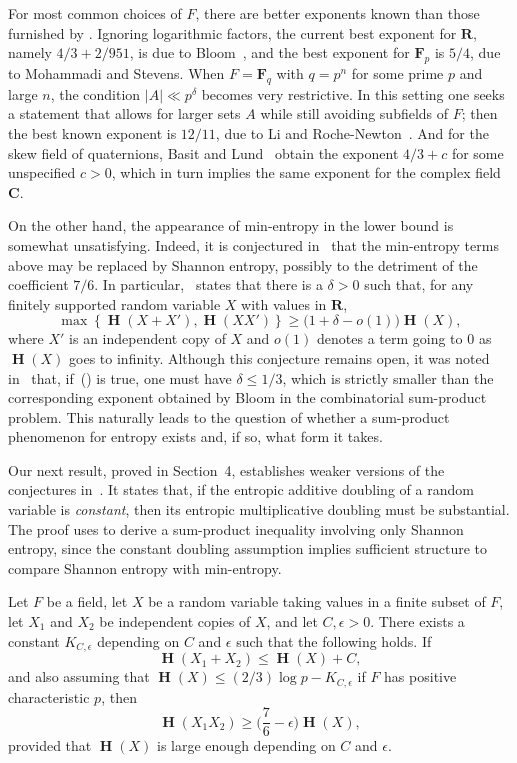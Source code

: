 \documentclass[twoside, 10pt]{article}
\renewcommand{\eqref}[1]{\textup{{\normalfont(\oldstylenums{\ref{#1}}}\normalfont)}}
\newcommand\eps{\epsilon}
\newcommand\FF{{\mathbf{F}}}
\DeclareMathOperator{\Eta}{\mathbf{H}}
\newcommand{\RR}{\mathbf{R}}   %
\newcommand{\CC}{\mathbf{C}}   %
\begin{document}
For most common choices of $F$, there are better exponents known than those furnished by .
Ignoring logarithmic factors, the current best exponent for $\RR$, 
namely $4/3 + 2/951$, is due to Bloom~\cite{bloom2025}, 
and the best exponent for $\FF_p$ is $5/4$, due to Mohammadi and Stevens. 
When $F = \FF_q$ with $q=p^n$ for some prime $p$ and large $n$, 
the condition $|A|\ll p^\delta$ becomes very restrictive. 
In this setting one seeks a statement that allows for larger 
sets $A$ while still avoiding subfields of $F$;
then the best known exponent is $12/11$, due to Li 
and Roche-Newton~\cite{LiRocheNewton}.
And for the skew field of quaternions,
Basit and Lund~\cite{basitlund2019}
obtain the exponent $4/3 + c$ for 
some unspecified $c>0$,
which in turn implies the same exponent for the complex field $\CC$.

On the other hand, the appearance of min-entropy in the 
lower bound is somewhat unsatisfying. Indeed, it is conjectured in~\cite{goh2024} that the min-entropy terms 
above may be replaced by Shannon entropy, possibly to 
the detriment of the coefficient $7/6$. 
In particular,~\cite[Conjecture~18]{goh2024} states that there is a
$\delta>0$ such that, for any finitely supported
random variable $X$ with values in $\RR$,
\begin{equation}
\max\left\{\Eta(X+X'), \Eta(XX') \right\} \ge 
\bigl(1+\delta-o(1)\bigr) \Eta(X),
\label{eq:conjecture}
\end{equation}
where $X'$ is an independent copy of $X$ and
$o(1)$ denotes a term going to $0$ as $\Eta(X)$ goes to infinity.
Although this conjecture remains open, it
was noted in~\cite{lgk2025} that, if~\eqref{eq:conjecture}
is true, one must have $\delta \le 1/3$, which is strictly smaller than the corresponding exponent obtained by Bloom in the combinatorial sum-product problem. This naturally leads to the question of whether a sum-product phenomenon for entropy exists and, if so, what form it takes. 
 
Our next result, proved in Section~4, establishes weaker
versions of the conjectures in~\cite{goh2024}.
It states that, if the entropic additive doubling of a random variable is 
\textit{constant}, then its entropic multiplicative doubling must 
be substantial.
The proof uses  to derive a sum-product inequality 
involving only Shannon entropy, since the constant doubling assumption 
implies sufficient structure to compare Shannon entropy with min-entropy. 

\begin{theorem}\label{thmweaksumproduct}
Let $F$ be a field, let $X$ be a random variable taking values 
in a finite subset of $F$, let $X_1$ and $X_2$ be independent copies of $X$,
and let $C,\epsilon>0$. 
There exists a constant $K_{C,\eps}$ depending
on $C$ and $\epsilon$ such that
the following holds. 
If
$$\Eta(X_1+X_2) \leq \Eta(X) + C,$$
and also assuming that 
$\Eta(X) \le (2/3)\log p - K_{C,\eps}$ if 
$F$ has positive characteristic $p$, 
then
$$\Eta(X_1 X_2) \geq \biggl(\frac{7}{6}-\epsilon \biggr)\Eta(X),$$
provided that $\Eta(X)$ is large enough depending on $C$ and $\epsilon$.
\end{theorem}
\end{document}
